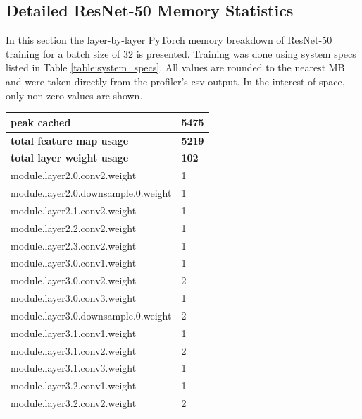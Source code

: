 \documentclass[12pt,letterpaper]{article}
\begin{document}
\newpage
\begin{appendices}


\section{Detailed ResNet-50 Memory Statistics}
\label{appendix:resnet_50_full_breakdown}
In this section the layer-by-layer PyTorch memory breakdown of ResNet-50 training for a batch size of 32 is presented. Training was done using system specs listed in Table \ref{table:system_specs}. All values are rounded to the nearest MB and were taken directly from the profiler's csv output. In the interest of space, only non-zero values are shown.
\begin{longtable}{@{}ll@{}}
\toprule
\textbf{peak cached}                              & \textbf{5475} \\ \midrule
\textbf{total feature map usage}                  & \textbf{5219} \\ \midrule
\textbf{total layer weight usage}                     & \textbf{102}  \\ \midrule
module.layer2.0.conv2.weight              & 1    \\ \midrule
module.layer2.0.downsample.0.weight       & 1    \\ \midrule
module.layer2.1.conv2.weight              & 1    \\ \midrule
module.layer2.2.conv2.weight              & 1    \\ \midrule
module.layer2.3.conv2.weight              & 1    \\ \midrule
module.layer3.0.conv1.weight              & 1    \\ \midrule
module.layer3.0.conv2.weight              & 2    \\ \midrule
module.layer3.0.conv3.weight              & 1    \\ \midrule
module.layer3.0.downsample.0.weight       & 2    \\ \midrule
module.layer3.1.conv1.weight              & 1    \\ \midrule
module.layer3.1.conv2.weight              & 2    \\ \midrule
module.layer3.1.conv3.weight              & 1    \\ \midrule
module.layer3.2.conv1.weight              & 1    \\ \midrule
module.layer3.2.conv2.weight              & 2    \\ \midrule

\end{longtable}
\end{appendices}
\end{document}
